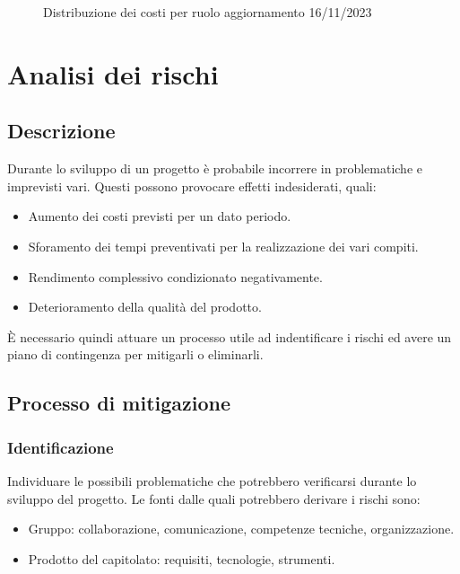 \documentclass{article}
\begin{document}
\begin{figure}[h]
    \centering
    \caption{Distribuzione dei costi per ruolo aggiornamento 16/11/2023}
\end{figure}

\section{Analisi dei rischi} \label{sec:AnalisiRischi}
\subsection{Descrizione}
Durante lo sviluppo di un progetto è probabile incorrere in problematiche e imprevisti vari. Questi possono provocare effetti indesiderati, quali:

\begin{itemize}
    \item Aumento dei costi previsti per un dato periodo.
    \item Sforamento dei tempi preventivati per la realizzazione dei vari compiti.
    \item Rendimento complessivo condizionato negativamente.
    \item Deterioramento della qualità del prodotto.
\end{itemize}

È necessario quindi attuare un processo utile ad indentificare i rischi ed avere un piano di contingenza per mitigarli o eliminarli.

\subsection{Processo di mitigazione}
\subsubsection{Identificazione}
Individuare le possibili problematiche che potrebbero verificarsi durante lo sviluppo del progetto. 
Le fonti dalle quali potrebbero derivare i rischi sono: 
\begin{itemize}
    \item Gruppo: collaborazione, comunicazione, competenze tecniche, organizzazione.
    \item Prodotto del capitolato: requisiti, tecnologie, strumenti.
\end{itemize}
\end{document}
